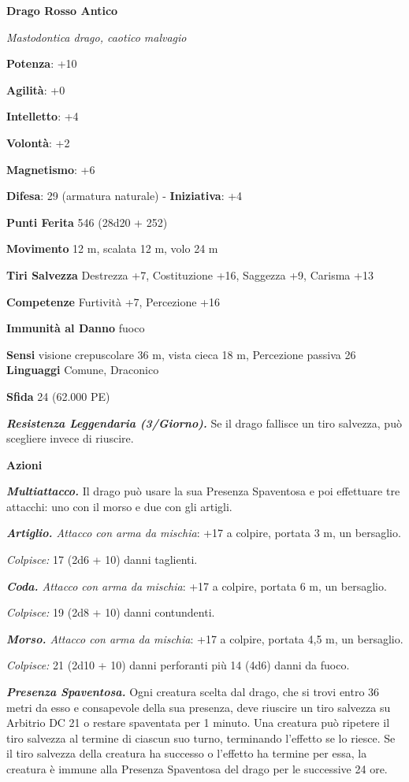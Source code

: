 \begin{multicols}{2}
\textbf{Drago Rosso Antico}

\emph{Mastodontica drago, caotico malvagio}

\textbf{Potenza}: +10

\textbf{Agilità}: +0

\textbf{Intelletto}: +4

\textbf{Volontà}: +2

\textbf{Magnetismo}: +6

\textbf{Difesa}: 29 (armatura naturale) - \textbf{Iniziativa}: +4

\textbf{Punti Ferita} 546 (28d20 + 252)

\textbf{Movimento} 12 m, scalata 12 m, volo 24 m

\textbf{Tiri Salvezza} Destrezza +7, Costituzione +16, Saggezza +9,
Carisma +13

\textbf{Competenze} Furtività +7, Percezione +16

\textbf{Immunità al Danno} fuoco

\textbf{Sensi} visione crepuscolare 36 m, vista cieca 18 m, Percezione passiva
26 \textbf{Linguaggi} Comune, Draconico

\textbf{Sfida} 24 (62.000 PE)

\emph{\textbf{Resistenza Leggendaria (3/Giorno).}} Se il drago fallisce
un tiro salvezza, può scegliere invece di riuscire.

\textbf{Azioni}

\emph{\textbf{Multiattacco.}} Il drago può usare la sua Presenza
Spaventosa e poi effettuare tre attacchi: uno con il morso e due con gli
artigli.

\emph{\textbf{Artiglio.} Attacco con arma da mischia}: +17 a colpire,
portata 3 m, un bersaglio.

\emph{Colpisce:} 17 (2d6 + 10) danni taglienti.

\emph{\textbf{Coda.} Attacco con arma da mischia}: +17 a colpire,
portata 6 m, un bersaglio.

\emph{Colpisce:} 19 (2d8 + 10) danni contundenti.

\emph{\textbf{Morso.} Attacco con arma da mischia}: +17 a colpire,
portata 4,5 m, un bersaglio.

\emph{Colpisce:} 21 (2d10 + 10) danni perforanti più 14 (4d6) danni da
fuoco.

\emph{\textbf{Presenza Spaventosa.}} Ogni creatura scelta dal drago, che
si trovi entro 36 metri da esso e consapevole della sua presenza, deve
riuscire un tiro salvezza su Arbitrio DC 21 o restare spaventata per 1
minuto. Una creatura può ripetere il tiro salvezza al termine di ciascun
suo turno, terminando l'effetto se lo riesce. Se il tiro salvezza della
creatura ha successo o l'effetto ha termine per essa, la creatura è
immune alla Presenza Spaventosa del drago per le successive 24 ore.


\end{multicols}
